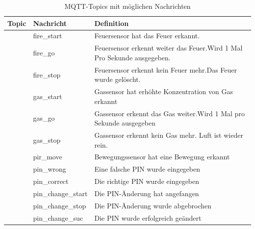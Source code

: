 \documentclass[12pt, letterpaper]{article}
\begin{document}
\begin{table}[h!]
  \centering
  \renewcommand{\arraystretch}{1.5}
  \begin{tabular}{|>{\centering\arraybackslash}p{2cm}|>{\centering\arraybackslash}p{3cm}|>{\centering\arraybackslash}m{11cm}|}
  \hline
  \textbf{Topic} & \textbf{Nachricht} & \textbf{Definition} \\ \hline
  \multirow{7}{*}{\centering alarm}  & fire\_start   & Feuersensor hat das Feuer erkannt.\\  \cline{2-3}
                          & fire\_go      & Feuersensor erkennt weiter das Feuer.\newline Wird 1 Mal Pro Sekunde ausgegeben.\\ \cline{2-3}
                          & fire\_stop    & Feuersensor erkennt kein Feuer mehr.\newline Das Feuer wurde gelöscht.\\\cline{2-3}
                          & gas\_start    & Gassensor hat erhöhte Konzentration von Gas erkannt\\ \cline{2-3}
                          & gas\_go       & Gassensor erkennt das Gas weiter.\newline Wird 1 Mal pro Sekunde ausgegeben\\     \cline{2-3}
                          & gas\_stop     & Gassensor erkennt kein Gas mehr. Luft ist wieder rein. \\ \cline{2-3}
                          & pir\_move     & Bewegungssensor hat eine Bewegung erkannt\\  \hline 
  \multirow{5}{*}{pin}    & pin\_wrong    & Eine falsche PIN wurde eingegeben\\ \cline{2-3}
                          & pin\_correct  & Die richtige PIN wurde eingegeben \\ \cline{2-3}
                          & pin\_change\_start  & Die PIN-Änderung hat angefangen \\ \cline{2-3}
                          & pin\_change\_stop   & Die PIN-Änderung wurde abgebrochen \\ \cline{2-3}
                          & pin\_change\_suc    & Die PIN wurde erfolgreich geändert \\ \hline
                         
  \end{tabular}
  
  \caption{MQTT-Topics mit möglichen Nachrichten}
  \end{table}
\end{document}
